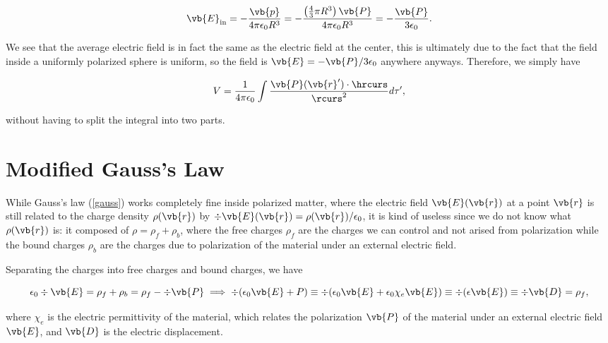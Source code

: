 \documentclass[english,a4paper,12pt]{report}
\begin{document}
\begin{equation}
    \vb{E} _{\text{in} } = - \frac{\vb{p} }{4\pi \epsilon_0 R^3 } = -\frac{\left( \frac{4}{3}\pi R^3   \right)\vb{P} }{4\pi \epsilon_0 R^3 } = -\frac{\vb{P} }{3\epsilon_0 }.    
\end{equation}

We see that the average electric field is in fact the same as the electric field at the center, this is ultimately due to the fact that the field inside a uniformly polarized sphere is uniform, so the field is \(\vb{E} = - \vb{P} /3\epsilon_0 \) anywhere anyways. Therefore, we simply have 

\begin{equation}
    V = \frac{1}{4\pi \epsilon_0} \int \frac{\vb{P} (\vb{r} ')\cdot \hrcurs }{\rcurs ^2} d\tau ',  
\end{equation}

without having to split the integral into two parts.




\section{Modified Gauss's Law}

While Gauss's law (\cref{gauss}) works completely fine inside polarized matter, where the electric field \(\vb{E} (\vb{r} )\) at a point \(\vb{r} \) is still related to the charge density \(\rho (\vb{r} )\)  by \(\div{\vb{E}(\vb{r} )} = \rho(\vb{r} ) / \epsilon_0 \), it is kind of useless since we do not know what \(\rho (\vb{r} )\) is: it composed of \(\rho = \rho _{f} + \rho _{b}  \), where the free charges \(\rho _{f} \) are the charges we can control and not arised from polarization while the bound charges \(\rho _{b} \) are the charges due to polarization of the material under an external electric field. 

Separating the charges into free charges and bound charges, we have

\begin{equation}
    \epsilon_0 \div{\vb{E} } = \rho _{f} + \rho _{b} = \rho _{f} - \div{\vb{P} }  \implies  \div{(\epsilon_0 \vb{E} +P)} \equiv \div{(\epsilon_0 \vb{E} + \epsilon_0 \chi _{e}\vb{E}  )} \equiv \div{(\epsilon \vb{E}) } \equiv  \div{\vb{D} } = \rho _{f},
\end{equation}

where \(\chi _{e} \) is the electric permittivity of the material, which relates the polarization \(\vb{P} \) of the material under an external electric field \(\vb{E} \), and \(\vb{D} \) is the electric displacement.    
\end{document}

